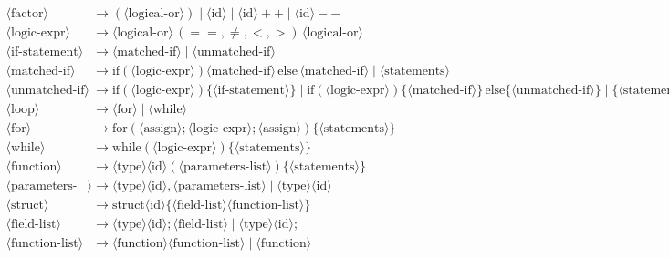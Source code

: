 \documentclass[12pt, a4paper]{report}
\begin{document}
\begin{align*}
	\langle \text{factor} \rangle &\to (\langle \text{logical-or} \rangle) \mid \langle \text{id} \rangle \mid \langle \text{id} \rangle++ \mid \langle \text{id} \rangle-- \\
	\langle \text{logic-expr} \rangle &\to \langle \text{logical-or} \rangle \, (==, \neq, <, >) \, \langle \text{logical-or} \rangle \\
	\langle \text{if-statement} \rangle &\to \langle \text{matched-if} \rangle \mid \langle \text{unmatched-if} \rangle \\
	\langle \text{matched-if} \rangle &\to \text{if} (\langle \text{logic-expr} \rangle) \langle \text{matched-if} \rangle \, \text{else} \, \langle \text{matched-if} \rangle \mid \langle \text{statements} \rangle \\
	\langle \text{unmatched-if} \rangle &\to \text{if} (\langle \text{logic-expr} \rangle) \{ \langle \text{if-statement} \rangle \} \mid \text{if} (\langle \text{logic-expr} \rangle) \{ \langle \text{matched-if} \rangle \} \, \text{else} \{ \langle \text{unmatched-if} \rangle \} \mid \{ \langle \text{statements} \rangle \} \\
	\langle \text{loop} \rangle &\to \langle \text{for} \rangle \mid \langle \text{while} \rangle \\
	\langle \text{for} \rangle &\to \text{for} (\langle \text{assign} \rangle; \langle \text{logic-expr} \rangle; \langle \text{assign} \rangle) \{ \langle \text{statements} \rangle \} \\
	\langle \text{while} \rangle &\to \text{while} (\langle \text{logic-expr} \rangle) \{ \langle \text{statements} \rangle \} \\
	\langle \text{function} \rangle &\to \langle \text{type} \rangle \langle \text{id} \rangle (\langle \text{parameters-list} \rangle) \{ \langle \text{statements} \rangle \} \\
	\langle \text{parameters-list} \rangle &\to \langle \text{type} \rangle \langle \text{id} \rangle, \langle \text{parameters-list} \rangle \mid \langle \text{type} \rangle \langle \text{id} \rangle \\
	\langle \text{struct} \rangle &\to \text{struct} \langle \text{id} \rangle \{ \langle \text{field-list} \rangle \langle \text{function-list} \rangle \} \\
	\langle \text{field-list} \rangle &\to \langle \text{type} \rangle \langle \text{id} \rangle; \langle \text{field-list} \rangle \mid \langle \text{type} \rangle \langle \text{id} \rangle; \\
	\langle \text{function-list} \rangle &\to \langle \text{function} \rangle \langle \text{function-list} \rangle \mid \langle \text{function} \rangle
\end{align*}
\pagebreak
\end{document}
